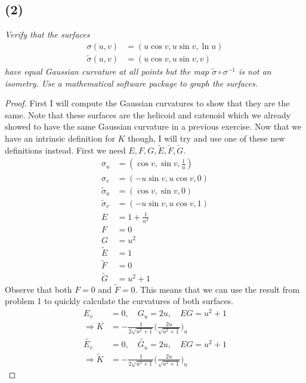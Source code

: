 \documentclass[a4paper, 11pt]{article}
\begin{document}
\subsection*{(2)}
	\textit{Verify that the surfaces
			\begin{align*}
				\sigma(u,v) &= (u\cos v, u\sin v, \ln u) \\ 
				\tilde{\sigma}(u,v) &= (u\cos v, u\sin v, v) 
			\end{align*}
	have equal Gaussian curvature at all points but the map $\tilde{\sigma}\circ\sigma^{-1}$ is not an isometry. Use a mathematical software package to graph the surfaces.}

	\begin{proof}
		First I will compute the Gaussian curvatures to show that they are the same. Note that these surfaces are the helicoid and catenoid which we already showed to have the same Gaussian curvature in a previous exercise. Now that we have an intrinsic definition for $K$ though, I will try and use one of these new definitions instead. First we need $E, F, G, \tilde{E}, \tilde{F}, \tilde{G}$. 
			\begin{align*}
				\sigma_u &= (\cos v, \sin v, \frac{1}{u}) \\ 
				\sigma_v &= (-u\sin v, u\cos v, 0)\\ 
				\tilde{\sigma}_u &= (\cos v, \sin v, 0 ) \\ 
				\tilde{\sigma}_v &= (-u\sin v, u\cos v, 1) \\ 
				E &= 1 + \frac{1}{u^2} \\ 
				F &= 0 \\ 
				G &= u^2 \\
				\tilde{E} &= 1 \\ 
				\tilde{F} &= 0 \\ 
				\tilde{G} &= u^2 + 1
			\end{align*}
		\noindent Observe that both $F=0$ and $\tilde{F} =0$. This means that we can use the result from problem 1 to quickly calculate the curvatures of both surfaces. 
			\begin{align}
				E_v &= 0, \quad G_u = 2u, \quad EG = u^2 + 1 \nonumber\\ 
				\Rightarrow K &= -\frac{1}{2\sqrt{u^2+1}}\Bigg(\frac{2u}{\sqrt{u^2+1}}\Bigg)_u \\ 
				\tilde{E_v} &= 0, \quad \tilde{G_u} = 2u, \quad EG = u^2+1 \nonumber\\ 
				\Rightarrow \tilde{K} &= -\frac{1}{2\sqrt{u^2+1}}\Bigg(\frac{2u}{\sqrt{u^2+1}}\Bigg)_u
			\end{align}

\end{proof}
\end{document}
